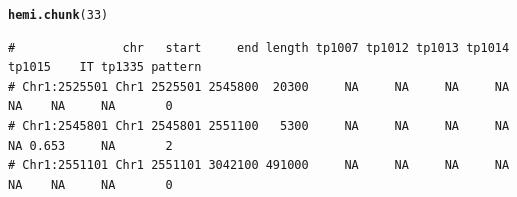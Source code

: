 \documentclass{article}\usepackage[]{graphicx}\usepackage[]{color}
\makeatletter
\newcommand{\hlnum}[1]{\textcolor[rgb]{0.686,0.059,0.569}{#1}}%
\newcommand{\hlstd}[1]{\textcolor[rgb]{0.345,0.345,0.345}{#1}}%
\newcommand{\hlkwd}[1]{\textcolor[rgb]{0.737,0.353,0.396}{\textbf{#1}}}%
\newenvironment{kframe}{%
 \def\at@end@of@kframe{}%
 \ifinner\ifhmode%
  \def\at@end@of@kframe{\end{minipage}}%
  \begin{minipage}{\columnwidth}%
 \fi\fi%
 \def\FrameCommand##1{\hskip\@totalleftmargin \hskip-\fboxsep
 \colorbox{shadecolor}{##1}\hskip-\fboxsep
     \hskip-\linewidth \hskip-\@totalleftmargin \hskip\columnwidth}%
 \MakeFramed {\advance\hsize-\width
   \@totalleftmargin\z@ \linewidth\hsize
   \@setminipage}}%
 {\par\unskip\endMakeFramed%
 \at@end@of@kframe}
\newenvironment{knitrout}{}{} %
\makeatother
\begin{document}
\begin{knitrout}\footnotesize
{}\color{fgcolor}\begin{kframe}
\begin{alltt}
\hlkwd{hemi.chunk}\hlstd{(}\hlnum{33}\hlstd{)}
\end{alltt}
\begin{verbatim}
#               chr   start     end length tp1007 tp1012 tp1013 tp1014 tp1015    IT tp1335 pattern
# Chr1:2525501 Chr1 2525501 2545800  20300     NA     NA     NA     NA     NA    NA     NA       0
# Chr1:2545801 Chr1 2545801 2551100   5300     NA     NA     NA     NA     NA 0.653     NA       2
# Chr1:2551101 Chr1 2551101 3042100 491000     NA     NA     NA     NA     NA    NA     NA       0
\end{verbatim}
\end{kframe}


\end{knitrout}
\end{document}
